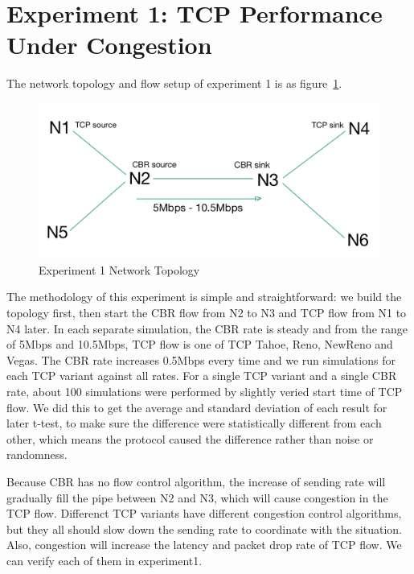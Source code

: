 \documentclass[10pt, conference]{lib/IEEEtran}
\begin{document}
\section{Experiment 1: TCP Performance Under Congestion}
The network topology and flow setup of experiment 1 is as figure~\ref{fig:exp1_tpg}.
\begin{figure}[!htb]
    \centering
    \includegraphics[width=0.8\linewidth]{images/top_exp1.png}
    \caption{Experiment 1 Network Topology}
    \label{fig:exp1_tpg}
\end{figure}
The methodology of this experiment is simple and straightforward: we 
build the topology first, then start the CBR flow from N2 to N3 and 
TCP flow from N1 to N4 later. In each separate simulation, the CBR rate
is steady and from the range of 5Mbps and 10.5Mbps, TCP flow is one of 
TCP Tahoe, Reno, NewReno and Vegas. The CBR rate increases 0.5Mbps 
every time and we run simulations for each TCP variant against all 
rates. For a single TCP variant and a single CBR rate, about 100 
simulations were performed by slightly veried start time of TCP flow. 
We did this to get the average and standard deviation of each result 
for later t-test, to make sure the difference were statistically 
different from each other, which means the protocol caused the 
difference rather than noise or randomness. 

Because CBR has no flow control algorithm, the increase of sending 
rate will gradually fill the pipe between N2 and N3, which will cause 
congestion in the TCP flow. Differenct TCP variants have different 
congestion control algorithms, but they all should slow down the 
sending rate to coordinate with the situation. Also, congestion will 
increase the latency and packet drop rate of TCP flow. We can verify each of them in experiment1.
\end{document}
